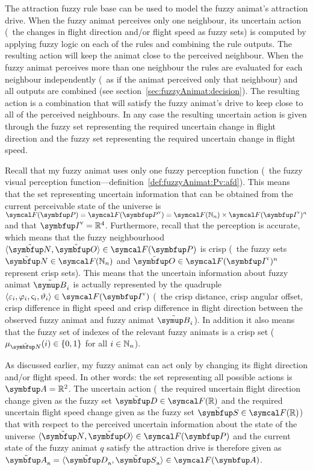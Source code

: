 The attraction fuzzy rule base can be used to model the fuzzy animat's attraction drive. When the fuzzy animat perceives only one neighbour, its uncertain action (\ie\ the changes in flight direction and/or flight speed as fuzzy sets) is computed by applying fuzzy logic on each of the rules and combining the rule outputs. The resulting action will keep the animat close to the perceived neighbour. When the fuzzy animat perceives more than one neighbour the rules are evaluated for each neighbour independently (\ie\ as if the animat perceived only that neighbour) and all outputs are combined (see section~\ref{sec:fuzzyAnimat:decision}). The resulting action is a combination that will satisfy the fuzzy animat's drive to keep close to all of the perceived neighbours. In any case the resulting uncertain action is given through the fuzzy set representing the required uncertain change in flight direction and the fuzzy set representing the required uncertain change in flight speed.

Recall that my fuzzy animat uses only one fuzzy perception function (\ie\ the fuzzy visual perception function---definition~\ref{def:fuzzyAnimat:Pv:afd}). This means that the set representing uncertain information that can be obtained from the current perceivable state of the universe is $\fpowset{\set{P}}=\fpowset{\set{P}^\textnormal{v}}=\fpowset{\N_n} \times \fpowset{\set{I}^\textnormal{v}}^n$ and that $\set{I}^\textnormal{v}=\R^4$. Furthermore, recall that the perception is accurate, which means that the fuzzy neighbourhood $\langle \fset{N}, \fset{O} \rangle \in \fpowset{\set{P}}$ is crisp (\ie\ the fuzzy sets $\fset{N} \in \fpowset{\N_n}$ and $\fset{O} \in \fpowset{\set{I}^\textnormal{v}}^n$ represent crisp sets). This means that the uncertain information about fuzzy animat $\fautom{B}_i$ is actually represented by the quadruple $\langle \varepsilon_i, \varphi_i, \varsigma_i, \vartheta_i \rangle \in \fpowset{\set{I}^\textnormal{v}}$ (\ie\ the crisp distance, crisp angular offset, crisp difference in flight speed and crisp difference in flight direction between the observed fuzzy animat and fuzzy animat $\fautom{B}_i$). In addition it also means that the fuzzy set of indexes of the relevant fuzzy animats is a crisp set (\ie\ $\mu_\fset{N}(i) \in \left\{0,1\right\}$ for all $i \in \mathbb{N}_n$).

As discussed earlier, my fuzzy animat can act only by changing its flight direction and/or flight speed. In other words: the set representing all possible actions is $\set{A}=\R^2$. The uncertain action (\ie\ the required uncertain flight direction change given as the fuzzy set $\fset{D} \in \fpowset{\R}$ and the required uncertain flight speed change given as the fuzzy set $\fset{S} \in \fpowset{\R}$) that with respect to the perceived uncertain information about the state of the universe $\langle \fset{N}, \fset{O} \rangle \in \fpowset{\set{P}}$ and the current state of the fuzzy animat $q$ satisfy the attraction drive is therefore given as $\fset{A}_\textnormal{a}=\langle \fset{D}_\textnormal{a}, \fset{S}_\textnormal{a} \rangle \in \fpowset{\set{A}}$.

